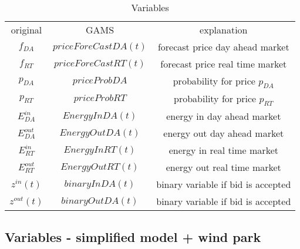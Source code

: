\documentclass{article}
\begin{document}
\begin{table}[]
\doublespacing
    \centering
    \begin{tabular}{c|c|c}
            original & GAMS & explanation \\
         $f_{DA}$ & $priceForeCastDA(t)$ & forecast price day ahead market\\
         $f_{RT}$ & $priceForeCastRT(t)$ &  forecast price real time market\\

         $p_{DA}$ & $ priceProbDA $ & probability for price $p_{DA}$ \\
         $p_{RT}$ & $ priceProbRT $ & probability for price $p_{RT}$ \\
         
         $E^{in}_{DA}$ & $EnergyInDA(t)$ & energy in day ahead market \\
         $E^{out}_{DA}$ & $EnergyOutDA(t)$ & energy out day ahead market \\

         $E^{in}_{RT}$ & $EnergyInRT(t)$ & energy in real time market \\
         $E^{out}_{RT}$ & $EnergyOutRT(t)$ & energy out  real time market \\

         $z^{in}(t)$ & $binaryInDA(t)$ & binary variable if bid is accepted\\
         $z^{out}(t)$ & $binaryOutDA(t)$ & binary variable if bid is accepted\\


    \end{tabular}
    \caption{Variables}
    \label{tab:my_label}
\end{table}




\subsection{Variables - simplified model + wind park}
\end{document}
